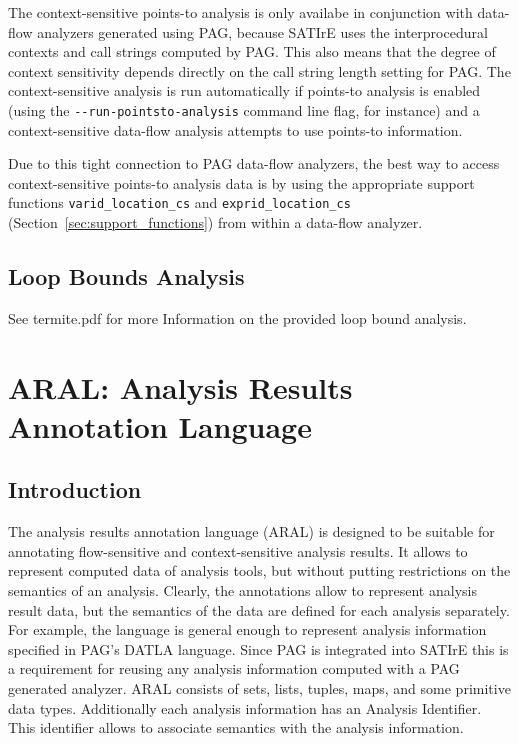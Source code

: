 \documentclass[a4paper,12pt]{report}
\begin{document}
The context-sensitive points-to analysis is only availabe in conjunction
with data-flow analyzers generated using PAG, because SATIrE uses the
interprocedural contexts and call strings computed by PAG. This also means
that the degree of context sensitivity depends directly on the call string
length setting for PAG. The context-sensitive analysis is run automatically
if points-to analysis is enabled (using the \verb|--run-pointsto-analysis|
command line flag, for instance) and a context-sensitive data-flow analysis
attempts to use points-to information.

Due to this tight connection to PAG data-flow analyzers, the best way to
access context-sensitive points-to analysis data is by using the appropriate
support functions \verb|varid_location_cs| and \verb|exprid_location_cs|
(Section~\ref{sec:support_functions}) from within a data-flow analyzer.

\section{Loop Bounds Analysis}
\label{sec:analysis_loopbounds}

See termite.pdf for more Information on the provided loop bound analysis.


\chapter{ARAL: Analysis Results Annotation Language}

\section{Introduction}
\label{section:aral}
The analysis results annotation language (ARAL) is designed to be suitable
for annotating flow-sensitive and context-sensitive analysis
results. It allows to represent computed data of analysis tools, but
without putting restrictions on the semantics of an analysis. Clearly,
the annotations allow to represent analysis result data, but the semantics of
the data are defined for each analysis separately. For example, the
language is general enough to represent analysis information specified
in PAG's %
DATLA language. Since PAG is integrated into
SATIrE this is a requirement for reusing any analysis information
computed with a PAG generated analyzer. ARAL consists of sets, lists,
tuples, maps, and some primitive data types. Additionally each
analysis information has an Analysis Identifier. This identifier
allows to associate semantics with the analysis information.
\end{document}
